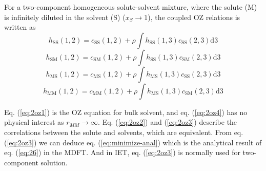 For a two-component homogeneous solute-solvent mixture, where the
solute (M) is infinitely diluted in the solvent (S) ($x_{S}\rightarrow1$),
the coupled \acs{OZ} relations is written as
\begin{equation}
h_{\mathrm{SS}}(1,2)=c_{\mathrm{SS}}(1,2)+\rho\int h_{\mathrm{SS}}(1,3)c_{\mathrm{SS}}(2,3)\mathrm{d}3\label{eq:2oz1}
\end{equation}
\begin{equation}
h_{\mathrm{SM}}(1,2)=c_{\mathrm{SM}}(1,2)+\rho\int h_{\mathrm{SS}}(1,3)c_{\mathrm{SM}}(2,3)\mathrm{d}3\label{eq:2oz2}
\end{equation}
\begin{equation}
h_{\mathrm{MS}}(1,2)=c_{\mathrm{MS}}(1,2)+\rho\int h_{\mathrm{MS}}(1,3)c_{\mathrm{SS}}(2,3)\mathrm{d}3\label{eq:2oz3}
\end{equation}
\begin{equation}
h_{\mathrm{MM}}(1,2)=c_{\mathrm{MM}}(1,2)+\rho\int h_{\mathrm{MS}}(1,3)c_{\mathrm{SM}}(2,3)\mathrm{d}3\label{eq:2oz4}
\end{equation}

Eq. (\ref{eq:2oz1}) is the \acs{OZ} equation for bulk solvent, and
eq. (\ref{eq:2oz4}) has no physical interest as $r_{MM}\rightarrow\infty$.
Eq. (\ref{eq:2oz2}) and (\ref{eq:2oz3}) describe the correlations
between the solute and solvents, which are equivalent. From eq. (\ref{eq:2oz3})
we can deduce eq. (\ref{eq:minimize-anal}) which is the analytical
result of eq. (\ref{eq:26}) in the \acs{MDFT}. And in \acs{IET},
eq. (\ref{eq:2oz3}) is normally used for two-component solution.

